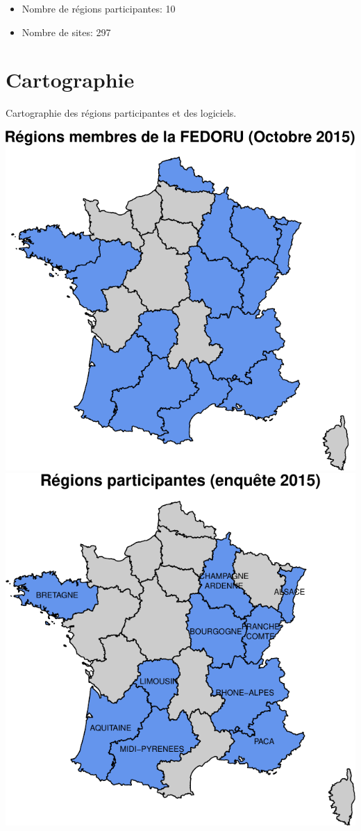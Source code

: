 \documentclass[]{article}
\begin{document}
\begin{itemize}
\itemsep1pt\parskip0pt
\item
  Nombre de régions participantes: 10
\item
  Nombre de sites: 297
\end{itemize}

\section{Cartographie}\label{cartographie}

Cartographie des régions participantes et des logiciels.

\includegraphics{septembre2015_files/figure-latex/carto_region-1.pdf}
\includegraphics{septembre2015_files/figure-latex/carto_region-2.pdf}
\end{document}
